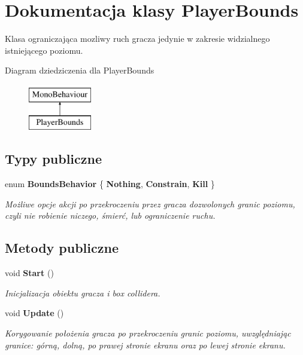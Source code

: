 \section{Dokumentacja klasy Player\+Bounds}
\label{class_player_bounds}


Klasa ograniczająca mozliwy ruch gracza jedynie w zakresie widzialnego istniejącego poziomu.  


Diagram dziedziczenia dla Player\+Bounds\begin{figure}[H]
\begin{center}
\leavevmode
\includegraphics[height=2.000000cm]{class_player_bounds}
\end{center}
\end{figure}
\subsection*{Typy publiczne}
\begin{DoxyCompactItemize}
\item 
enum {\bf Bounds\+Behavior} \{ {\bfseries Nothing}, 
{\bfseries Constrain}, 
{\bfseries Kill}
 \}\begin{DoxyCompactList}\small\item\em Możliwe opcje akcji po przekroczeniu przez gracza dozwolonych granic poziomu, czyli nie robienie niczego, śmierć, lub ograniczenie ruchu. \end{DoxyCompactList}
\end{DoxyCompactItemize}
\subsection*{Metody publiczne}
\begin{DoxyCompactItemize}
\item 
void {\bf Start} ()
\begin{DoxyCompactList}\small\item\em Inicjalizacja obiektu gracza i box collidera. \end{DoxyCompactList}\item 
void {\bf Update} ()
\begin{DoxyCompactList}\small\item\em Korygowanie położenia gracza po przekroczeniu granic poziomu, uwzględniając granice\+: górną, dolną, po prawej stronie ekranu oraz po lewej stronie ekranu. \end{DoxyCompactList}\end{DoxyCompactItemize}
